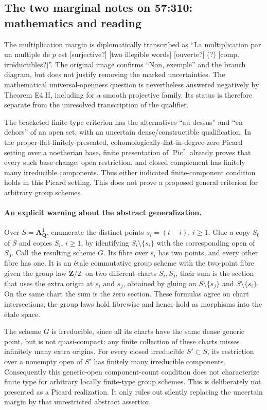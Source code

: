 \subsection{The two marginal notes on 57:310: mathematics and reading}

The multiplication margin is diplomatically transcribed as
``La multiplication par un multiple de $p$ est [surjective?]
[two illegible words] [ouverte?] (?) [comp. irr\'eductibles?]''.
The original image confirms ``Non, exemple'' and the branch diagram,
but does not justify removing the marked uncertainties. The mathematical
universal-openness question is nevertheless answered negatively by
Theorem E4.H, including for a smooth projective family. Its status is
therefore separate from the unresolved transcription of the qualifier.

The bracketed finite-type criterion has the alternatives ``au dessus''
and ``en dehors'' of an open set, with an uncertain dense/constructible
qualification. In the proper-flat-finitely-presented,
cohomologically-flat-in-degree-zero Picard setting over a noetherian
base, finite presentation of $\operatorname{Pic}^{\tau}$ already proves
that every such base change, open restriction, and closed complement has
finitely many irreducible components. Thus either indicated
finite-component condition holds in this Picard setting. This does not
prove a proposed general criterion for arbitrary group schemes.

\paragraph{An explicit warning about the abstract generalization.}
Over $S=\mathbf A^1_{\mathbf Q}$, enumerate the distinct points
$s_i=(t-i)$, $i\geq1$. Glue a copy $S_0$ of $S$ and copies $S_i$,
$i\geq1$, by identifying $S_i\setminus\{s_i\}$ with the corresponding
open of $S_0$. Call the resulting scheme $G$. Its fibre over $s_i$ has
two points, and every other fibre has one. It is an \'etale commutative
group scheme with the two-point fibre given the group law
$\mathbf Z/2$: on two different charts $S_i,S_j$, their sum is the
section that uses the extra origin at $s_i$ and $s_j$, obtained by gluing
on $S\setminus\{s_j\}$ and $S\setminus\{s_i\}$. On the same chart
the sum is the zero section. These formulas agree on chart intersections;
the group laws hold fibrewise and hence hold as morphisms into the
\'etale space.

The scheme $G$ is irreducible, since all its charts have the same dense
generic point, but is not quasi-compact: any finite collection of these
charts misses infinitely many extra origins. For every closed irreducible
$S'\subset S$, its restriction over a nonempty open of $S'$ has finitely
many irreducible components. Consequently this generic-open
component-count condition does not characterize finite type for arbitrary
locally finite-type group schemes. This is deliberately not presented as
a Picard realization. It only rules out silently replacing the uncertain
margin by that unrestricted abstract assertion.


